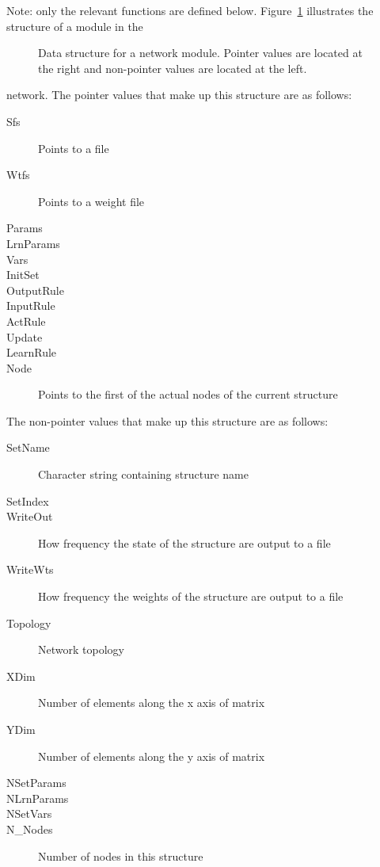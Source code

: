 \documentclass[12pt]{article}
\begin{document}
Note: only the relevant functions are defined below.
Figure~\ref{nodeSet} illustrates the structure of a module in the
\begin{figure}[htp]
  \centerline{}
  \caption{Data structure for a network module. Pointer values are
  located at the right and non-pointer values are located at the
  left. }
  \label{nodeSet}
\end{figure}
network. The pointer values that make up this structure are as
follows: 
\begin{description}
  \item[Sfs] Points to a file
  \item[Wtfs] Points to a weight file
  \item[Params]
  \item[LrnParams]
  \item[Vars]
  \item[InitSet]
  \item[OutputRule]
  \item[InputRule]
  \item[ActRule]
  \item[Update]
  \item[LearnRule]
  \item[Node] Points to the first of the actual nodes of the current 
              structure
\end{description}
The non-pointer values that make up this structure are as 
follows:
\begin{description}
  \item[SetName] Character string containing structure name
  \item[SetIndex]
  \item[WriteOut] How frequency the state of the structure are output
                  to a file
  \item[WriteWts] How frequency the weights of the structure are output
                  to a file
  \item[Topology] Network topology
  \item[XDim] Number of elements along the x axis of matrix
  \item[YDim] Number of elements along the y axis of matrix
  \item[NSetParams]
  \item[NLrnParams]
  \item[NSetVars]
  \item[N\_Nodes] Number of nodes in this structure
\end{description} 
\end{document}
